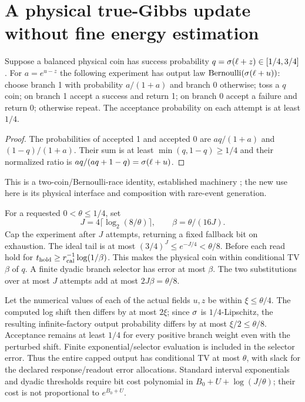 \section{A physical true-Gibbs update without fine energy estimation}

\begin{lemma}\label{lem:gibbs}
Suppose a balanced physical coin has success probability
$q=\sigma(\ell+z)\in[1/4,3/4]$. For $a=e^{u-z}$ the following experiment has
output law $\operatorname{Bernoulli}(\sigma(\ell+u))$: choose branch 1 with
probability $a/(1+a)$ and branch 0 otherwise; toss a $q$ coin; on branch 1
accept a success and return 1; on branch 0 accept a failure and return 0;
otherwise repeat. The acceptance probability on each attempt is at least
$1/4$.
\end{lemma}
\begin{proof}
The probabilities of accepted 1 and accepted 0 are $aq/(1+a)$ and
$(1-q)/(1+a)$. Their sum is at least $\min(q,1-q)\ge1/4$ and their
normalized ratio is $aq/(aq+1-q)=\sigma(\ell+u)$.
\end{proof}
This is a two-coin/Bernoulli-race identity, established machinery
\cite{barker,bernoullirace}; the new use here is its physical interface and
composition with rare-event generation.

For a requested $0<\theta\le1/4$, set
\[
 J=4\lceil\log_2(8/\theta)\rceil,\qquad
 \beta=\theta/(16J).
\]
Cap the experiment after $J$ attempts, returning a fixed fallback bit on
exhaustion. The ideal tail is at most $(3/4)^J\le e^{-J/4}<\theta/8$.
Before each read hold for
$t_{\rm hold}\ge r_{\rm cal}^{-1}\log(1/\beta)$.
This makes the physical coin within conditional TV $\beta$ of $q$.
A finite dyadic branch selector has error at most $\beta$. The two
substitutions over at most $J$ attempts add at most $2J\beta=\theta/8$.

Let the numerical values of each of the actual fields $u,z$ be within
$\xi\le\theta/4$. The computed log shift then differs by at most $2\xi$;
since $\sigma$ is $1/4$-Lipschitz, the resulting infinite-factory output
probability differs by at most $\xi/2\le\theta/8$. Acceptance remains at least
$1/4$ for every positive branch weight even with the perturbed shift.
Finite exponential/selector evaluation is included in the selector error.
Thus the entire capped output has conditional TV at most $\theta$, with
slack for the declared response/readout error allocations. Standard interval
exponentials and dyadic thresholds require bit cost polynomial in
$B_0+U+\log(J/\theta)$; their cost is not proportional to $e^{B_0+U}$.

